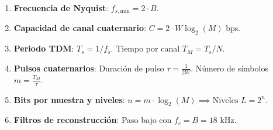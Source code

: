 \begin{mecanizado}
\begin{enumerate}
    \item \textbf{Frecuencia de Nyquist}: $f_{s,\text{min}} = 2 \cdot B$.
    \item \textbf{Capacidad de canal cuaternario}: $C = 2 \cdot W \log_2(M)$ bps.
    \item \textbf{Periodo TDM}: $T_s = 1/f_s$. Tiempo por canal $T_M = T_s / N$.
    \item \textbf{Pulsos cuaternarios}: Duración de pulso $\tau = \frac{1}{2W}$. Número de símbolos $m = \frac{T_M}{\tau}$.
    \item \textbf{Bits por muestra y niveles}: $n = m \cdot \log_2(M) \implies \text{Niveles } L = 2^n$.
    \item \textbf{Filtros de reconstrucción}: Paso bajo con $f_c = B = 18$ kHz.
\end{enumerate}
\end{mecanizado}

